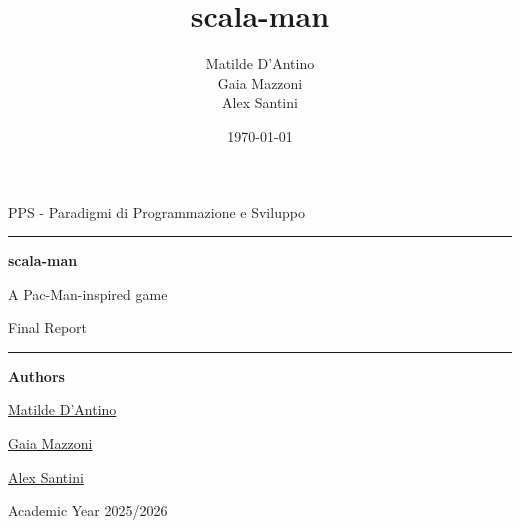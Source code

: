 \documentclass[11pt,a4paper]{report}
\title{scala-man}
\author{%
  Matilde D'Antino\\%
  Gaia Mazzoni\\%
  Alex Santini%
}
\date{\today}
\newcommand{\todayFullUS}{\DTMtoday}
\begin{document}
\begin{titlepage}
    \thispagestyle{empty}
    \centering
    \vspace*{2.2cm}

    {\Large\color{ink} PPS - Paradigmi di Programmazione e Sviluppo\par}
    \vspace{1.2cm}
    {\rule{0.82\textwidth}{0.5pt}\par}
    \vspace{0.9cm}
    {\fontsize{34}{40}\selectfont\bfseries\color{ink} scala-man\par}
    \vspace{0.35cm}
    {\Large\color{ink} A Pac-Man-inspired game\par}
    \vspace{0.35cm}
    {\LARGE\color{ink} Final Report\par}
    \vspace{0.9cm}
    {\rule{0.82\textwidth}{0.5pt}\par}

    \vspace{1.6cm}
    {\large\bfseries\color{ink} Authors\par}
    \vspace{0.25cm}
    {\large \href{https://github.com/matidan01}{Matilde D'Antino}\par}
    {\large \href{https://github.com/GaiaMazzoni}{Gaia Mazzoni}\par}
    {\large \href{https://github.com/AlexSantini10}{Alex Santini}\par}

    \vfill
    {\large\color{ink} Academic Year 2025/2026\par}
    {\large\color{ink} \todayFullUS\par}
\end{titlepage}

\tableofcontents
\cleardoublepage
{}


\clearpage

\clearpage

\clearpage

\clearpage

\clearpage

\clearpage

\clearpage

\end{document}
